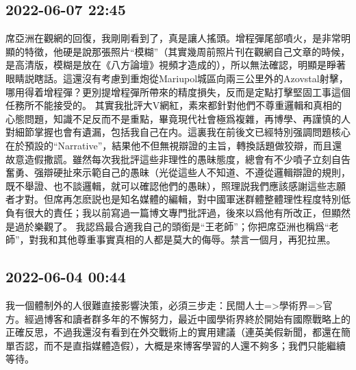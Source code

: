 \documentclass[twocolumn]{ctexart}
\begin{document}
\subsection*{2022-06-07 22:45}

席亞洲在觀網的回復，我剛剛看到了，真是讓人搖頭。增程彈尾部噴火，是非常明顯的特徵，他硬是說那張照片“模糊”（其實幾周前照片刊在觀網自己文章的時候，是高清版，模糊是放在《八方論壇》視頻才造成的），所以無法確認，明顯是睜著眼睛説瞎話。這還沒有考慮到重炮從Mariupol城區向兩三公里外的Azovstal射擊，哪用得着增程彈？更別提增程彈所帶來的精度損失，反而是定點打擊堅固工事這個任務所不能接受的。
其實我批評大V網紅，素來都針對他們不尊重邏輯和真相的心態問題，知識不足反而不是重點，畢竟現代社會極爲複雜，再博學、再謹慎的人對細節掌握也會有遺漏，包括我自己在内。這裏我在前後文已經特別强調問題核心在於預設的“Narrative”，結果他不但無視辯證的主旨，轉換話題做狡辯，而且還故意造假撒謊。雖然每次我批評這些非理性的愚昧態度，總會有不少噴子立刻自告奮勇、强辯硬扯來示範自己的愚昧（光從這些人不知道、不遵從邏輯辯證的規則，既不舉證、也不談邏輯，就可以確認他們的愚昧），照理説我們應該感謝這些志願者才對。但席再怎麽説也是知名媒體的編輯，對中國軍迷群體整體理性程度特別低負有很大的責任；我以前寫過一篇博文專門批評過，後來以爲他有所改正，但顯然是過於樂觀了。
我認爲最合適我自己的頭銜是“王老師”；你把席亞洲也稱爲“老師”，對我和其他尊重事實真相的人都是莫大的侮辱。禁言一個月，再犯拉黑。
\subsection*{2022-06-04 00:44}

我一個體制外的人很難直接影響決策，必須三步走：民間人士=>學術界=>官方。經過博客和讀者群多年的不懈努力，最近中國學術界終於開始有國際戰略上的正確反思，不過我還沒有看到在外交戰術上的實用建議（連英美假新聞，都還在簡單否認，而不是直指媒體造假），大概是來博客學習的人還不夠多；我們只能繼續等待。
\end{document}
